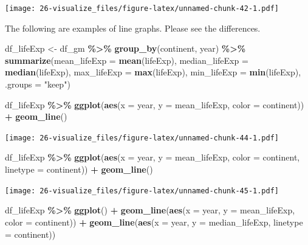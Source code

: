 \documentclass[
  xelatex, ja=standard]{bxjsbook}
\newenvironment{Shaded}{\begin{snugshade}}{\end{snugshade}}
\newcommand{\AttributeTok}[1]{\textcolor[rgb]{0.13,0.29,0.53}{#1}}
\newcommand{\FunctionTok}[1]{\textcolor[rgb]{0.13,0.29,0.53}{\textbf{#1}}}
\newcommand{\NormalTok}[1]{#1}
\newcommand{\OtherTok}[1]{\textcolor[rgb]{0.56,0.35,0.01}{#1}}
\newcommand{\SpecialCharTok}[1]{\textcolor[rgb]{0.81,0.36,0.00}{\textbf{#1}}}
\newcommand{\StringTok}[1]{\textcolor[rgb]{0.31,0.60,0.02}{#1}}
\theoremstyle{definition}
\theoremstyle{definition}
\theoremstyle{definition}
\theoremstyle{definition}
\theoremstyle{remark}
\begin{document}
\texttt{[image: 26-visualize\_files/figure-latex/unnamed-chunk-42-1.pdf]}

The following are examples of line graphs. Please see the differences.

\begin{Shaded}
\begin{Highlighting}[]
\NormalTok{df\_lifeExp }\OtherTok{\textless{}{-}}\NormalTok{ df\_gm }\SpecialCharTok{\%\textgreater{}\%} 
  \FunctionTok{group\_by}\NormalTok{(continent, year) }\SpecialCharTok{\%\textgreater{}\%} 
  \FunctionTok{summarize}\NormalTok{(}\AttributeTok{mean\_lifeExp =} \FunctionTok{mean}\NormalTok{(lifeExp), }\AttributeTok{median\_lifeExp =} \FunctionTok{median}\NormalTok{(lifeExp), }\AttributeTok{max\_lifeExp =} \FunctionTok{max}\NormalTok{(lifeExp), }\AttributeTok{min\_lifeExp =} \FunctionTok{min}\NormalTok{(lifeExp), }\AttributeTok{.groups =} \StringTok{"keep"}\NormalTok{)}
\end{Highlighting}
\end{Shaded}

\begin{Shaded}
\begin{Highlighting}[]
\NormalTok{df\_lifeExp }\SpecialCharTok{\%\textgreater{}\%} \FunctionTok{ggplot}\NormalTok{(}\FunctionTok{aes}\NormalTok{(}\AttributeTok{x =}\NormalTok{ year, }\AttributeTok{y =}\NormalTok{ mean\_lifeExp, }\AttributeTok{color =}\NormalTok{ continent)) }\SpecialCharTok{+}
  \FunctionTok{geom\_line}\NormalTok{()}
\end{Highlighting}
\end{Shaded}

\texttt{[image: 26-visualize\_files/figure-latex/unnamed-chunk-44-1.pdf]}

\begin{Shaded}
\begin{Highlighting}[]
\NormalTok{df\_lifeExp }\SpecialCharTok{\%\textgreater{}\%} \FunctionTok{ggplot}\NormalTok{(}\FunctionTok{aes}\NormalTok{(}\AttributeTok{x =}\NormalTok{ year, }\AttributeTok{y =}\NormalTok{ mean\_lifeExp, }\AttributeTok{color =}\NormalTok{ continent, }\AttributeTok{linetype =}\NormalTok{ continent)) }\SpecialCharTok{+}
  \FunctionTok{geom\_line}\NormalTok{()}
\end{Highlighting}
\end{Shaded}

\texttt{[image: 26-visualize\_files/figure-latex/unnamed-chunk-45-1.pdf]}

\begin{Shaded}
\begin{Highlighting}[]
\NormalTok{df\_lifeExp }\SpecialCharTok{\%\textgreater{}\%} \FunctionTok{ggplot}\NormalTok{() }\SpecialCharTok{+}
  \FunctionTok{geom\_line}\NormalTok{(}\FunctionTok{aes}\NormalTok{(}\AttributeTok{x =}\NormalTok{ year, }\AttributeTok{y =}\NormalTok{ mean\_lifeExp, }\AttributeTok{color =}\NormalTok{ continent)) }\SpecialCharTok{+} 
  \FunctionTok{geom\_line}\NormalTok{(}\FunctionTok{aes}\NormalTok{(}\AttributeTok{x =}\NormalTok{ year, }\AttributeTok{y =}\NormalTok{ median\_lifeExp, }\AttributeTok{linetype =}\NormalTok{ continent))}
\end{Highlighting}
\end{Shaded}
\end{document}
